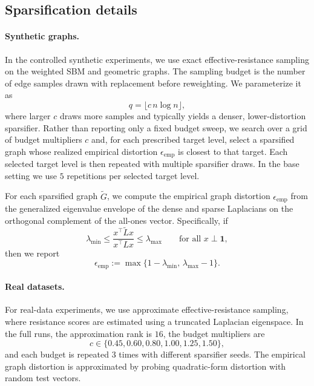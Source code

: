 \documentclass{article}
\begin{document}
\subsection{Sparsification details}
\label{app:sparsifier}

\paragraph{Synthetic graphs.}
In the controlled synthetic experiments, we use exact effective-resistance sampling on the weighted SBM and geometric graphs. The sampling budget is the number of edge samples drawn with replacement before reweighting. We parameterize it as
\[
q=\lfloor c\,n\log n\rfloor,
\]
where larger $c$ draws more samples and typically yields a denser, lower-distortion sparsifier.
Rather than reporting only a fixed budget sweep, we search over a grid of budget multipliers $c$ and, for each prescribed target level, select a sparsified graph whose realized empirical distortion $\epsilon_{\mathrm{emp}}$ is closest to that target. Each selected target level is then repeated with multiple sparsifier draws. In the base setting we use $5$ repetitions per selected target level.

For each sparsified graph $\widetilde G$, we compute the empirical graph distortion $\epsilon_{\mathrm{emp}}$ from the generalized eigenvalue envelope of the dense and sparse Laplacians on the orthogonal complement of the all-ones vector. Specifically, if
\[
\lambda_{\min} \le \frac{x^\top \widetilde L x}{x^\top L x} \le \lambda_{\max}
\qquad \text{for all } x \perp \mathbf{1},
\]
then we report
\[
\epsilon_{\mathrm{emp}} := \max\{1-\lambda_{\min},\,\lambda_{\max}-1\}.
\]



\paragraph{Real datasets.}
For real-data experiments, we use approximate effective-resistance sampling, where resistance scores are estimated using a truncated Laplacian eigenspace. In the full runs, the approximation rank is $16$, the budget multipliers are
\begin{equation}
c \in \{0.45,0.60,0.80,1.00,1.25,1.50\},
\end{equation}
and each budget is repeated $3$ times with different sparsifier seeds. The empirical graph distortion is approximated by probing quadratic-form distortion with random test vectors.
\end{document}
